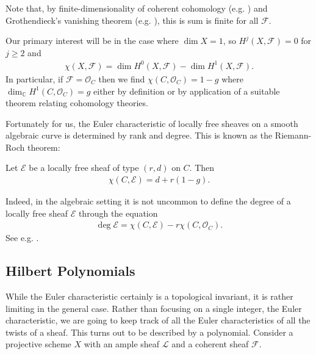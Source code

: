 \documentclass[12pt]{ociamthesis}  %
\begin{document}
Note that, by finite-dimensionality of coherent cohomology
(e.g. \cite[\href{https://stacks.math.columbia.edu/tag/02O6}{Tag 02O6}]{stacks-project}) and Grothendieck's vanishing theorem (e.g.
\cite[III Theorem 2.7]{hartshorne1977}), this is sum is finite for
all $\mathscr F$.

\begin{example}
  Our primary interest will be in the case where
  $\dim X = 1$, so $H^j(X,\mathscr F)=0$ for $j\geq 2$ and
  \begin{align*}
    \chi (X,\mathscr F) = \dim H^0(X,\mathscr F)-\dim H^1(X,\mathscr F).
  \end{align*}
  In particular, if $\mathscr F = \mathscr O_C$ then we
  find $\chi(C,\mathscr O_C) = 1 - g$ where $\dim_{\mathbb C}H^1(C,\mathscr O_C)=g$
  either by definition or by application of a suitable theorem
  relating cohomology theories.
\end{example}

Fortunately for us, the Euler characteristic of locally free
sheaves on a smooth algebraic curve is determined by rank
and degree. This is known as the Riemann-Roch theorem:

\begin{theorem}\label{thm:riemann_roch}
  Let $\mathscr E$ be a locally free sheaf of type $(r,d)$
  on $C$. Then
  \begin{align*}
    \chi(C,\mathscr E) = d + r(1-g).
  \end{align*}
\end{theorem}

Indeed, in the algebraic setting it is not uncommon to define
the degree of a locally free sheaf $\mathscr E$ through the
equation
\begin{align*}
  \deg \mathscr E = \chi(C,\mathscr E)  - r\chi(C,\mathscr O_C).
\end{align*}
See e.g. \cite[\href{https://stacks.math.columbia.edu/tag/0AYQ}{Tag 0AYQ}]{stacks-project}.

\subsection{Hilbert Polynomials}

While the Euler characteristic certainly is a topological invariant,
it is rather limiting in the general case. Rather than focusing on
a single integer, the Euler characteristic,
we are going to keep track of all the Euler characteristics of all
the twists of a sheaf. This turns out to be described by a polynomial.
Consider a projective scheme $X$ with an ample sheaf $\mathscr L$
and a coherent sheaf $\mathscr F$.
\end{document}
